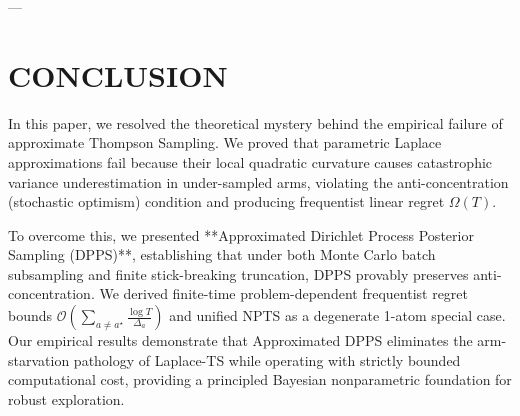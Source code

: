 \documentclass[twoside]{article}
\begin{document}
---

\section{CONCLUSION}
\label{sec:conclusion}

In this paper, we resolved the theoretical mystery behind the empirical failure of approximate Thompson Sampling. We proved that parametric Laplace approximations fail because their local quadratic curvature causes catastrophic variance underestimation in under-sampled arms, violating the anti-concentration (stochastic optimism) condition and producing frequentist linear regret $\Omega(T)$. 

To overcome this, we presented **Approximated Dirichlet Process Posterior Sampling (DPPS)**, establishing that under both Monte Carlo batch subsampling and finite stick-breaking truncation, DPPS provably preserves anti-concentration. We derived finite-time problem-dependent frequentist regret bounds $\mathcal{O}\left(\sum_{a \ne a^\star} \frac{\log T}{\Delta_a}\right)$ and unified NPTS as a degenerate 1-atom special case. Our empirical results demonstrate that Approximated DPPS eliminates the arm-starvation pathology of Laplace-TS while operating with strictly bounded computational cost, providing a principled Bayesian nonparametric foundation for robust exploration.
\end{document}
